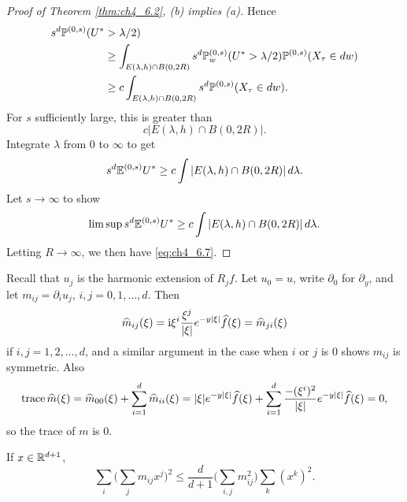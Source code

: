 \begin{proof}[Proof of Theorem \ref{thm:ch4_6.2}, (b) implies (a)]
Hence
\begin{align*}
    s^d\P^{(0,s)}(U^* &> \lambda/2) \\
    &\geq \int_{E(\lambda,h)\cap B(0,2R)} s^d\P_w^{(0,s)}(U^* > \lambda/2)\P^{(0,s)}(X_\tau \in dw) \\
    &\geq c\int_{E(\lambda,h)\cap B(0,2R)} s^d\P^{(0,s)}(X_\tau \in dw).
\end{align*}
For $s$ sufficiently large, this is greater than
\[
    c|E(\lambda,h) \cap B(0,2R)|.
\]
Integrate $\lambda$ from $0$ to $\infty$ to get
\[
    s^d\E^{(0,s)}U^* \geq c\int |E(\lambda,h) \cap B(0,2R)|\,d\lambda.
\]
Let $s \to \infty$ to show
\[
    \limsup s^d\E^{(0,s)}U^* \geq c\int |E(\lambda,h) \cap B(0,2R)|\,d\lambda.
\]
Letting $R \to \infty$, we then have \eqref{eq:ch4_6.7}.
\end{proof}

Recall that $u_j$ is the harmonic extension of $R_j f$. Let $u_0 = u$, write $\partial_0$ for $\partial_y$, and let $m_{ij} = \partial_i u_j$, $i,j = 0,1,\ldots,d$. Then
\[
    \widehat{m}_{ij}(\xi) = \im\xi^i \frac{\xi^j}{|\xi|}e^{-y|\xi|}\widehat{f}(\xi) = \widehat{m}_{ji}(\xi)
\]
if $i,j = 1,2,\ldots,d$, and a similar argument in the case when $i$ or $j$ is $0$ shows $m_{ij}$ is symmetric. Also
\[
    \trace \widehat{m}(\xi) = \widehat{m}_{00}(\xi)+\sum_{i=1}^d \widehat{m}_{ii}(\xi) = |\xi|e^{-y|\xi|}\widehat{f}(\xi)+\sum_{i=1}^d \frac{-(\xi^i)^2}{|\xi|}e^{-y|\xi|}\widehat{f}(\xi) = 0,
\]
so the trace of $m$ is $0$.

\begin{proposition}\label{prop:ch4_6.8}
If $x \in \R^{d+1}$,
\begin{equation}\label{eq:ch4_6.8}
    \sum_i\Big(\sum_j m_{ij}x^j\Big)^2 \leq \frac{d}{d+1}\Big(\sum_{i,j} m_{ij}^2\Big)\sum_k(x^k)^2.
\end{equation}
\end{proposition}

\mpagebreak

